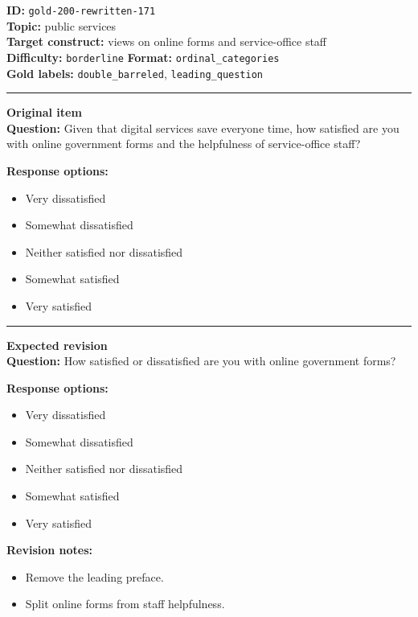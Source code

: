 \documentclass[10pt,a4paper]{article}
\newcommand{\sectionline}{\vspace{0.15em}\hrule\vspace{0.35em}}
\begin{document}
\begin{tcolorbox}[colframe=FlawRed,colback=white,colbacktitle=FlawRed!9,coltitle=black,title={Item 171\hfill Flawed item}]
\textbf{ID:} \texttt{gold-200-rewritten-171}\\
\textbf{Topic:} public services\\
\textbf{Target construct:} views on online forms and service-office staff\\
\textbf{Difficulty:} \texttt{borderline} \quad \textbf{Format:} \texttt{ordinal\_categories}\\
\textbf{Gold labels:} \texttt{double\_barreled}, \texttt{leading\_question}\\
\sectionline
\textbf{Original item}\\
\textbf{Question:} Given that digital services save everyone time, how satisfied are you with online government forms and the helpfulness of service-office staff?
\par\textbf{Response options:}
\begin{itemize}
\item Very dissatisfied
\item Somewhat dissatisfied
\item Neither satisfied nor dissatisfied
\item Somewhat satisfied
\item Very satisfied
\end{itemize}
\sectionline
\textbf{Expected revision}\\
\textbf{Question:} How satisfied or dissatisfied are you with online government forms?
\par\textbf{Response options:}
\begin{itemize}
\item Very dissatisfied
\item Somewhat dissatisfied
\item Neither satisfied nor dissatisfied
\item Somewhat satisfied
\item Very satisfied
\end{itemize}
\par\textbf{Revision notes:}
\begin{itemize}
\item Remove the leading preface.
\item Split online forms from staff helpfulness.
\end{itemize}
\end{tcolorbox}
\end{document}
